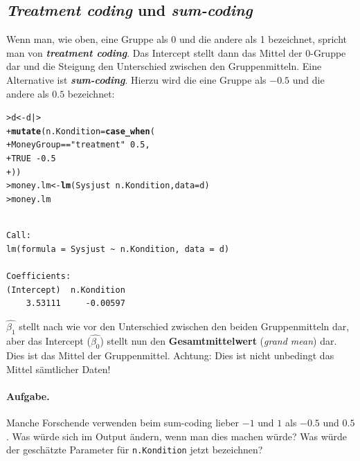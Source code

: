 \documentclass[oneside, 10pt]{book}\usepackage[]{graphicx}\usepackage[]{xcolor}
\makeatletter
\newcommand{\hlnum}[1]{\textcolor[rgb]{0.686,0.059,0.569}{#1}}%
\newcommand{\hlstr}[1]{\textcolor[rgb]{0.192,0.494,0.8}{#1}}%
\newcommand{\hlopt}[1]{\textcolor[rgb]{0,0,0}{#1}}%
\newcommand{\hlstd}[1]{\textcolor[rgb]{0.345,0.345,0.345}{#1}}%
\newcommand{\hlkwb}[1]{\textcolor[rgb]{0.69,0.353,0.396}{#1}}%
\newcommand{\hlkwc}[1]{\textcolor[rgb]{0.333,0.667,0.333}{#1}}%
\newcommand{\hlkwd}[1]{\textcolor[rgb]{0.737,0.353,0.396}{\textbf{#1}}}%
\newenvironment{kframe}{%
 \def\at@end@of@kframe{}%
 \ifinner\ifhmode%
  \def\at@end@of@kframe{\end{minipage}}%
  \begin{minipage}{\columnwidth}%
 \fi\fi%
 \def\FrameCommand##1{\hskip\@totalleftmargin \hskip-\fboxsep
 \colorbox{shadecolor}{##1}\hskip-\fboxsep
     \hskip-\linewidth \hskip-\@totalleftmargin \hskip\columnwidth}%
 \MakeFramed {\advance\hsize-\width
   \@totalleftmargin\z@ \linewidth\hsize
   \@setminipage}}%
 {\par\unskip\endMakeFramed%
 \at@end@of@kframe}
\newenvironment{knitrout}{}{} %
\makeatother
\begin{document}
\subsection{\textit{Treatment coding} und \textit{sum-coding}}\label{sec:sumcoding}
Wenn man, wie oben, eine Gruppe als 0 und die andere als 1 bezeichnet,
spricht man von \textbf{\textit{treatment coding}}. Das Intercept
stellt dann das Mittel der 0-Gruppe dar und die Steigung den Unterschied
zwischen den Gruppenmitteln.
Eine Alternative ist \textbf{\textit{sum-coding}}. Hierzu wird die eine Gruppe
als $-0.5$ und die andere als $0.5$ bezeichnet:
\begin{knitrout}
\color{fgcolor}\begin{kframe}
\begin{alltt}
\hlstd{> }\hlstd{d} \hlkwb{<-} \hlstd{d |>}
\hlstd{+ }  \hlkwd{mutate}\hlstd{(}\hlkwc{n.Kondition} \hlstd{=} \hlkwd{case_when}\hlstd{(}
\hlstd{+ }    \hlstd{MoneyGroup} \hlopt{==} \hlstr{"treatment"} \hlopt{~} \hlnum{0.5}\hlstd{,}
\hlstd{+ }    \hlnum{TRUE}                      \hlopt{~ -}\hlnum{0.5}
\hlstd{+ }  \hlstd{))}
\hlstd{> }\hlstd{money.lm} \hlkwb{<-} \hlkwd{lm}\hlstd{(Sysjust} \hlopt{~} \hlstd{n.Kondition,} \hlkwc{data} \hlstd{= d)}
\hlstd{> }\hlstd{money.lm}
\end{alltt}
\begin{verbatim}

Call:
lm(formula = Sysjust ~ n.Kondition, data = d)

Coefficients:
(Intercept)  n.Kondition  
    3.53111     -0.00597  
\end{verbatim}
\end{kframe}
\end{knitrout}
$\widehat{\beta_1}$ stellt nach wie vor den Unterschied zwischen
den beiden Gruppenmitteln dar, aber das Intercept ($\widehat{\beta_0}$)
stellt nun den \textbf{Gesamtmittelwert} (\textit{grand mean}) dar.
Dies ist das Mittel der Gruppenmittel.
Achtung: Dies ist nicht unbedingt das Mittel sämtlicher Daten!

\paragraph{Aufgabe.}
Manche Forschende verwenden beim sum-coding lieber $-1$ und $1$ als $-0.5$ und $0.5$.
Was würde sich im Output ändern, wenn man dies machen würde?
Was würde der geschätzte Parameter für \texttt{n.Kondition} jetzt bezeichnen?
\end{document}
